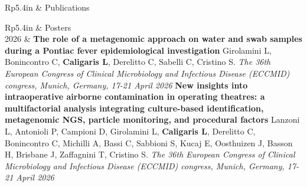 \documentclass[letterpaper, 11pt]{article}
\newcommand{\headingfont}{\Large\color{OliveGreen}}
\newenvironment{SectionTable}[1]{
	\renewcommand*{\arraystretch}{1.7}
	\setlength{\tabcolsep}{10pt}
	\begin{longtable}{Rp{5.4in}} & #1 \\}
{\end{longtable}\vspace{-.3cm}}
\begin{document}
\begin{SectionTable}{\headingfont Publications}

\end{SectionTable}


\begin{SectionTable}{\headingfont Posters}
2026 &
\textbf{The role of a metagenomic approach on water and swab samples 
during a Pontiac fever epidemiological investigation} \newline
Girolamini L, Bonincontro C, \textbf{Caligaris L}, Derelitto C, Sabelli C, Cristino S. \newline
\textit{The 36th European Congress of Clinical Microbiology and Infectious Disease (ECCMID) congress, Munich, Germany, 17-21 April 2026}\newline
\textbf{New insights into intraoperative airborne contamination in operating theatres: a
multifactorial analysis integrating culture-based identification, metagenomic NGS, particle
monitoring, and procedural factors} \newline
Lanzoni L, Antonioli P, Campioni D, Girolamini L, \textbf{Caligaris L}, Derelitto C, Bonincontro C, Michilli A, Bassi C, Sabbioni S, Kucaj E, Oosthuizen J, Basson H, Brisbane J, Zaffagnini T, Cristino S. \newline
\textit{The 36th European Congress of Clinical Microbiology and Infectious Disease (ECCMID) congress, Munich, Germany, 17-21 April 2026}\\


\end{SectionTable}
\end{document}

